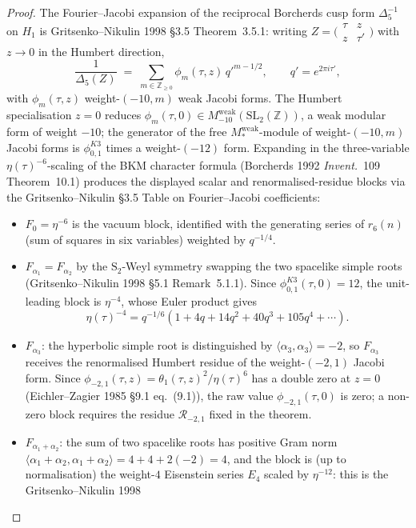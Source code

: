 \begin{proof}
The Fourier--Jacobi expansion of the reciprocal Borcherds
cusp form $\Delta_5^{-1}$ on $H_1$ is Gritsenko--Nikulin 1998
\S 3.5 Theorem~3.5.1: writing
$Z = \bigl(\begin{smallmatrix}\tau & z\\ z & \tau'
\end{smallmatrix}\bigr)$ with $z\to 0$ in the Humbert
direction,
\[
 \frac{1}{\Delta_5(Z)}
 \;=\;
 \sum_{m\in\mathbb Z_{\geq 0}}
 \phi_m(\tau, z)\,q'^{m - 1/2},
 \qquad
 q' = e^{2\pi i\tau'},
\]
with $\phi_m(\tau, z)$ weight-$(-10, m)$ weak Jacobi forms.
The Humbert specialisation $z = 0$ reduces
$\phi_m(\tau, 0)\in M_{-10}^{\mathrm{weak}}(\mathrm{SL}_2(\mathbb Z))$,
a weak modular form of weight $-10$; the generator of the free
$M_*^{\mathrm{weak}}$-module of weight-$(-10, m)$ Jacobi forms is
\(\phi_{0,1}^{K3}\) times a weight-$(-12)$ form. Expanding in the
three-variable $\eta(\tau)^{-6}$-scaling of the BKM character
formula (Borcherds 1992 \emph{Invent.}~109 Theorem~10.1)
produces the displayed scalar and renormalised-residue blocks via the
Gritsenko--Nikulin
\S 3.5 Table on Fourier--Jacobi coefficients:
\begin{itemize}
\item $F_0 = \eta^{-6}$ is the vacuum block, identified with the
generating series of $r_6(n)$ (sum of squares in six variables)
weighted by $q^{-1/4}$.
\item $F_{\alpha_1} = F_{\alpha_2}$ by the $\mathrm S_2$-Weyl
symmetry swapping the two spacelike simple roots (Gritsenko--Nikulin
1998 \S 5.1 Remark~5.1.1). Since
\(\phi_{0,1}^{K3}(\tau,0)=12\), the unit-leading block is
\(\eta^{-4}\), whose Euler product gives
\[
\eta(\tau)^{-4}=q^{-1/6}(1+4q+14q^2+40q^3+105q^4+\cdots).
\]
\item $F_{\alpha_3}$: the hyperbolic simple root is distinguished
by $\langle\alpha_3, \alpha_3\rangle = -2$, so $F_{\alpha_3}$
receives the renormalised Humbert residue of the weight-$(-2,1)$
Jacobi form. Since
$\phi_{-2,1}(\tau,z)=\theta_1(\tau,z)^2/\eta(\tau)^6$ has a double
zero at $z=0$ (Eichler--Zagier 1985 \S 9.1 eq.~(9.1)), the raw value
$\phi_{-2,1}(\tau,0)$ is zero; a non-zero block requires the residue
$\mathcal R_{-2,1}$ fixed in the theorem.
\item $F_{\alpha_1 + \alpha_2}$: the sum of two spacelike roots
has positive Gram norm $\langle\alpha_1+\alpha_2,
\alpha_1+\alpha_2\rangle = 4+4+2(-2) = 4$, and the block is
(up to normalisation) the weight-$4$ Eisenstein series $E_4$
scaled by $\eta^{-12}$: this is the Gritsenko--Nikulin 1998

\end{itemize}
\end{proof}
